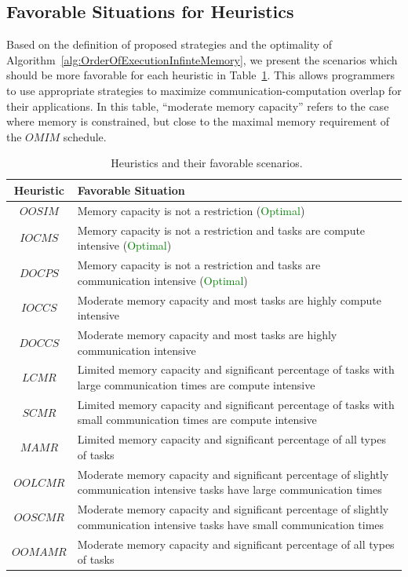 \documentclass[sigconf]{acmart}
\begin{document}
{		\subsection{Favorable Situations for Heuristics}
		Based on the definition of proposed strategies and the optimality of Algorithm~\ref{alg:OrderOfExecutionInfinteMemory}, we present the scenarios which should be more favorable for each heuristic in Table~\ref{tab:heuristicsAndFavorableScenarios}. This allows programmers to use appropriate strategies to maximize communication-computation overlap for their applications. In this table, ``moderate memory capacity'' refers to the case where memory is constrained, but close to the maximal memory requirement of the $OMIM$ schedule.
		
		\begin{table}[htb]
			\begin{tabular}{|c|p{6.5cm}|}
				\hline
				\textbf{Heuristic} & \textbf{\hspace{2cm}Favorable Situation} \\ \hline
				$OOSIM$ & Memory capacity is not a restriction (\textcolor{green}{Optimal}) \\ \hline
				$IOCMS$ & Memory capacity is not a restriction and tasks are compute intensive (\textcolor{green}{Optimal}) \\ \hline
				$DOCPS$ & Memory capacity is not a restriction and tasks are communication intensive (\textcolor{green}{Optimal}) \\ \hline
				$IOCCS$ & Moderate memory capacity and most tasks are highly compute intensive \\ \hline
				$DOCCS$ & Moderate memory capacity and most tasks are highly communication intensive \\ \hline
				$LCMR$ & Limited memory capacity and significant percentage of tasks with large communication times are compute intensive\\ \hline
				$SCMR$ & Limited memory capacity and significant percentage of tasks with small communication times are compute intensive\\ \hline
				$MAMR$ & Limited memory capacity and significant percentage of all types of tasks\\ \hline
				$OOLCMR$ & Moderate memory capacity and significant percentage of slightly communication intensive tasks have large communication times\\ \hline
				$OOSCMR$ & Moderate memory capacity and significant percentage of slightly communication intensive tasks have small communication times\\ \hline
				$OOMAMR$ & Moderate memory capacity and significant percentage of all types of tasks \\ \hline
			\end{tabular}\caption{~\label{tab:heuristicsAndFavorableScenarios}Heuristics and their favorable scenarios.}
		\end{table}
		
}
\end{document}
